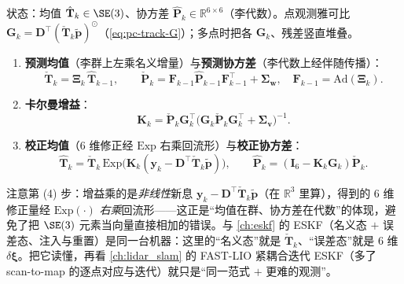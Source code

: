\begin{algo}\label{alg:pc-track-ekf}
状态：均值 $\hat{\mathbf{T}}_k\in\SE(3)$、协方差 $\hat{\mathbf{P}}_k\in\mathbb{R}^{6\times6}$（李代数）。点观测雅可比 $\mathbf{G}_k=\mathbf{D}^\top(\check{\mathbf{T}}_k\tilde{\mathbf{p}})^{\odot}$（\cref{eq:pc-track-G}）；多点时把各 $\mathbf{G}_k$、残差竖直堆叠。
\begin{enumerate}
  \item \textbf{预测均值}（李群上左乘名义增量）与\textbf{预测协方差}（李代数上经伴随传播）：
  \begin{equation}
    \check{\mathbf{T}}_k=\boldsymbol{\Xi}_k\,\hat{\mathbf{T}}_{k-1},\qquad
    \check{\mathbf{P}}_k=\mathbf{F}_{k-1}\hat{\mathbf{P}}_{k-1}\mathbf{F}_{k-1}^\top+\boldsymbol{\Sigma}_{\mathbf w},\quad
    \mathbf{F}_{k-1}=\mathrm{Ad}(\boldsymbol{\Xi}_k).
    \label{eq:pc-track-ekf-predict}
  \end{equation}
  \item \textbf{卡尔曼增益}：
  \begin{equation}
    \mathbf{K}_k=\check{\mathbf{P}}_k\mathbf{G}_k^\top\big(\mathbf{G}_k\check{\mathbf{P}}_k\mathbf{G}_k^\top+\boldsymbol{\Sigma}_{\mathbf v}\big)^{-1}.
    \label{eq:pc-track-ekf-gain}
  \end{equation}
  \item \textbf{校正均值}（$6$ 维修正经 $\mathrm{Exp}$ 右乘回流形）与\textbf{校正协方差}：
  \begin{equation}
    \hat{\mathbf{T}}_k=\check{\mathbf{T}}_k\,\mathrm{Exp}\!\big(\mathbf{K}_k(\mathbf{y}_k-\mathbf{D}^\top\check{\mathbf{T}}_k\tilde{\mathbf{p}})\big),\qquad
    \hat{\mathbf{P}}_k=(\mathbf{I}_6-\mathbf{K}_k\mathbf{G}_k)\check{\mathbf{P}}_k.
    \label{eq:pc-track-ekf-correct}
  \end{equation}
\end{enumerate}
\end{algo}

\begin{insight}
注意第 (4) 步：增益乘的是\emph{非线性}新息 $\mathbf{y}_k-\mathbf{D}^\top\check{\mathbf{T}}_k\tilde{\mathbf{p}}$（在 $\mathbb{R}^3$ 里算），得到的 $6$ 维修正量经 $\mathrm{Exp}(\cdot)$ \emph{右乘}回流形——这正是“均值在群、协方差在代数”的体现，避免了把 $\SE(3)$ 元素当向量直接相加的错误。与 \cref{ch:eskf} 的 ESKF（名义态 $+$ 误差态、注入与重置）是同一台机器：这里的“名义态”就是 $\check{\mathbf{T}}_k$、“误差态”就是 $6$ 维 $\delta\boldsymbol{\xi}$。把它读懂，再看 \cref{ch:lidar_slam} 的 FAST-LIO 紧耦合迭代 ESKF（多了 scan-to-map 的逐点对应与迭代）就只是“同一范式 $+$ 更难的观测”。
\end{insight}

